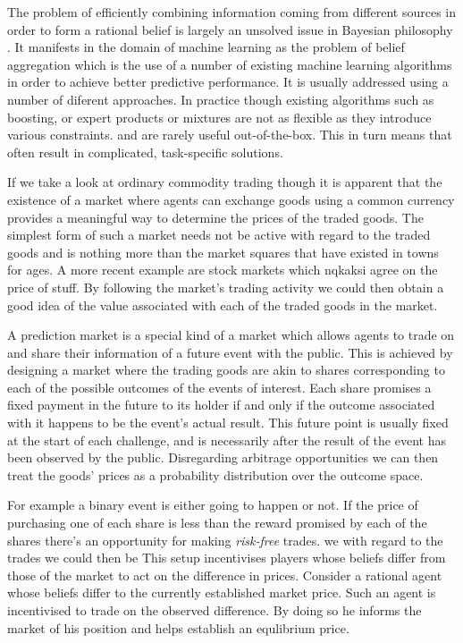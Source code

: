 \documentclass[bsc,frontabs,twoside,singlespacing,parskip,deptreport]{infthesis}     %
\begin{document}
The problem of efficiently combining information coming from different sources in order to form a rational belief is largely an unsolved issue in Bayesian philosophy \cite{greene_collective_2010}. It manifests in the domain of machine learning as the problem of belief aggregation which is the use of a number of existing machine learning algorithms in order to achieve better predictive performance. It is usually addressed using a number of diferent approaches. In practice though existing algorithms such as boosting, or expert products or mixtures are not as flexible as they introduce various constraints. and are rarely useful out-of-the-box. This in turn means that often result in complicated, task-specific solutions.

	If we take a look at ordinary commodity trading though it is apparent that the existence of a market where agents can exchange goods using a common currency provides a meaningful way to determine the prices of the traded goods. The simplest form of such a market needs not be active with regard to the traded goods and is nothing more than the market squares that have existed in towns for ages. A more recent example are stock markets which nqkaksi agree on the price of stuff. By following the market's trading activity we could then obtain a good idea of the value associated with each of the traded goods in the market. 

	A prediction market is a special kind of a market which allows agents to trade on and share their information of a future event with the public. This is achieved by designing a market where the trading goods are akin to shares corresponding to each of the possible outcomes of the events of interest. Each share promises a fixed payment in the future to its holder if and only if the outcome associated with it happens to be the event's actual result. This future point is usually fixed at the start of each challenge, and is necessarily after the result of the event has been observed by the public. Disregarding arbitrage opportunities we can then treat the goods' prices as a probability distribution over the outcome space. 
	
	
	For example a binary event is either going to happen or not. If the price of purchasing one of each share is less than the reward promised by each of the shares there's an opportunity for making {\em risk-free} trades.  we   with regard to the trades we could then be This setup incentivises players whose beliefs differ from those of the market to act on the difference in prices. Consider a rational agent whose beliefs differ to the currently established market price. Such an agent is incentivised to trade on the observed difference. By doing so he informs the market of his position and helps establish an equlibrium price. 
\end{document}
